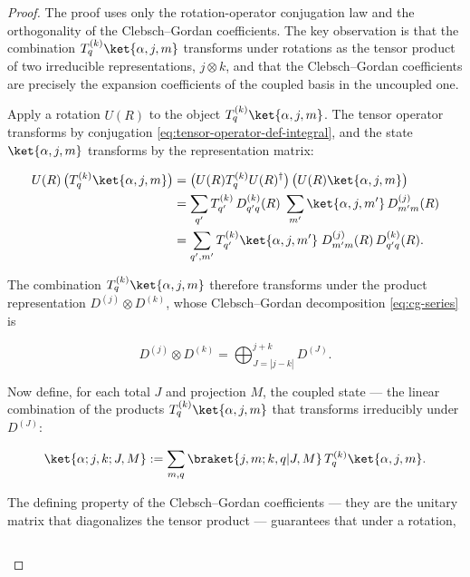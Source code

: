 \begin{proof}
The proof uses only the rotation-operator conjugation law and the orthogonality of the Clebsch--Gordan coefficients. The key observation is that the combination $T^{(k)}_q\ket{\alpha,j,m}$ transforms under rotations as the tensor product of two irreducible representations, $j \otimes k$, and that the Clebsch--Gordan coefficients are precisely the expansion coefficients of the coupled basis in the uncoupled one.

Apply a rotation $U(R)$ to the object $T^{(k)}_q\ket{\alpha,j,m}$. The tensor operator transforms by conjugation \eqref{eq:tensor-operator-def-integral}, and the state $\ket{\alpha,j,m}$ transforms by the representation matrix:
\begin{linenomath}
\begin{align*}
U(R)\,\bigl(T^{(k)}_q\ket{\alpha,j,m}\bigr)
&= \bigl(U(R)T^{(k)}_q U(R)^\dagger\bigr)\,\bigl(U(R)\ket{\alpha,j,m}\bigr) \\
&= \sum_{q'} T^{(k)}_{q'}\,D^{(k)}_{q'q}(R)\;
   \sum_{m'} \ket{\alpha,j,m'}\,D^{(j)}_{m'm}(R) \\
&= \sum_{q',m'} T^{(k)}_{q'}\ket{\alpha,j,m'}\;
   D^{(j)}_{m'm}(R)\,D^{(k)}_{q'q}(R) .
\end{align*}
\end{linenomath}
The combination $T^{(k)}_q\ket{\alpha,j,m}$ therefore transforms under the product representation $D^{(j)}\otimes D^{(k)}$, whose Clebsch--Gordan decomposition \eqref{eq:cg-series} is
\begin{linenomath}
\begin{equation*}
D^{(j)}\otimes D^{(k)} = \bigoplus_{J=|j-k|}^{j+k} D^{(J)} .
\end{equation*}
\end{linenomath}
Now define, for each total $J$ and projection $M$, the coupled state --- the linear combination of the products $T^{(k)}_q\ket{\alpha,j,m}$ that transforms irreducibly under $D^{(J)}$:
\begin{linenomath}
\begin{equation}
\ket{\alpha; j,k; J,M}
:= \sum_{m,q} \braket{j,m;k,q|J,M}\,
   T^{(k)}_q\ket{\alpha,j,m} .
\label{eq:we-coupled-state}
\end{equation}
\end{linenomath}
The defining property of the Clebsch--Gordan coefficients --- they are the unitary matrix that diagonalizes the tensor product --- guarantees that under a rotation,
\begin{linenomath}
\begin{equation*}

\end{equation*}
\end{linenomath}
\end{proof}
